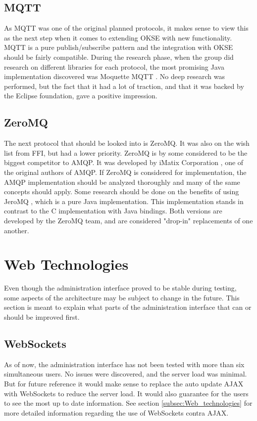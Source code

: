 \subsection{MQTT}
As MQTT was one of the original planned protocols, it makes sense to view this as the next step when it comes to extending OKSE with new functionality. MQTT is a pure publish/subscribe pattern and the integration with OKSE should be fairly compatible. 
During the research phase, when the group did research on different libraries for each protocol, the most promising Java implementation discovered was Moquette MQTT \cite{moquette-mqtt}. No deep research was performed, but the fact that it had a lot of traction, and that it was backed by the Eclipse foundation, gave a positive impression.

\subsection{ZeroMQ}
The next protocol that should be looked into is ZeroMQ. It was also on the wish list from FFI, but had a lower priority. ZeroMQ is by some considered to be the biggest competitor to AMQP. It was developed by iMatix Corporation \cite{imatix}, one of the original authors of AMQP. If ZeroMQ is considered for implementation, the AMQP implementation should be analyzed thoroughly and many of the same concepts should apply. Some research should be done on the benefits of using JeroMQ \cite{jero-mq}, which is a pure Java implementation. This implementation stands in contrast to the C implementation with Java bindings. Both versions are developed by the ZeroMQ team, and are considered "drop-in" replacements of one another.

\section{Web Technologies}
Even though the administration interface proved to be stable during testing, some aspects of the architecture may be subject to change in the future. This section is meant to explain what parts of the administration interface that can or should be improved first. 

\subsection{WebSockets}
As of now, the administration interface has not been tested with more than six simultaneous users. No issues were discovered, and the server load was minimal. But for future reference it would make sense to replace the auto update AJAX with WebSockets to reduce the server load. It would also guarantee for the users to see the most up to date information. See section \ref{subsec:Web_technologies} for more detailed information regarding the use of WebSockets contra AJAX.

\clearpage
